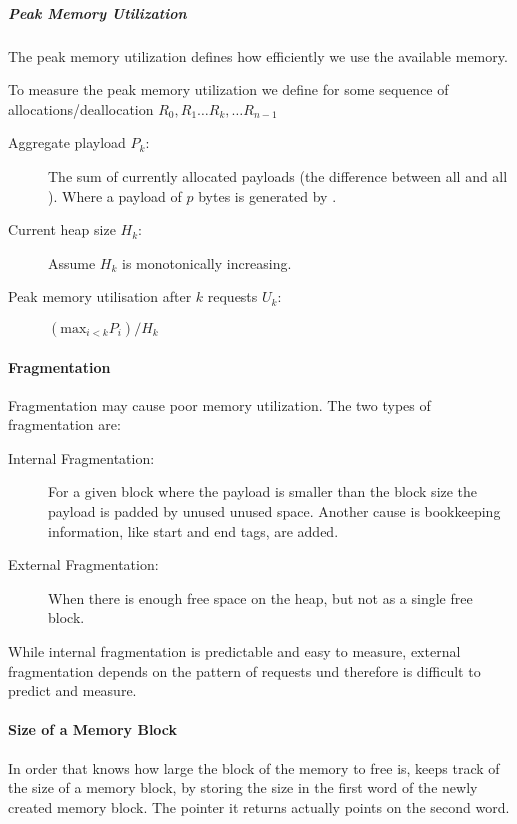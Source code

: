 \subparagraph{Peak Memory Utilization}
The peak memory utilization defines how efficiently we use the available memory.

To measure the peak memory utilization we define for some sequence of allocations/deallocation $R_0, R_1 \dots R_k, \dots R_{n-1}$

\begin{description}
    \item[Aggregate playload $P_k$:] The sum of currently allocated payloads (the difference between all  and all ). Where a payload of $p$ bytes is generated by .
    \item[Current heap size $H_k$:] Assume $H_k$ is monotonically increasing.
    \item[Peak memory utilisation after $k$ requests $U_k$:] $(\text{max}_{i<k} P_i) / H_k$ 
\end{description}

\paragraph{Fragmentation}
Fragmentation may cause poor memory utilization. The two types of fragmentation are:

\begin{description}
    \item[Internal Fragmentation:] For a given block where the payload is smaller than the block size
        the payload is padded by unused unused space. Another cause is bookkeeping information, like start and end tags, are added.
    \item[External Fragmentation:] When there is enough free space on the heap, but not as a single free block.
\end{description}

While internal fragmentation is predictable and easy to measure, external fragmentation depends on the pattern of requests und therefore is difficult to predict and measure.

\paragraph{Size of a Memory Block}
In order that  knows how large the block of the memory to free is,  keeps track of the size of a memory block, by storing the size in the first word of the newly created memory block. The pointer it returns actually points on the second word.

